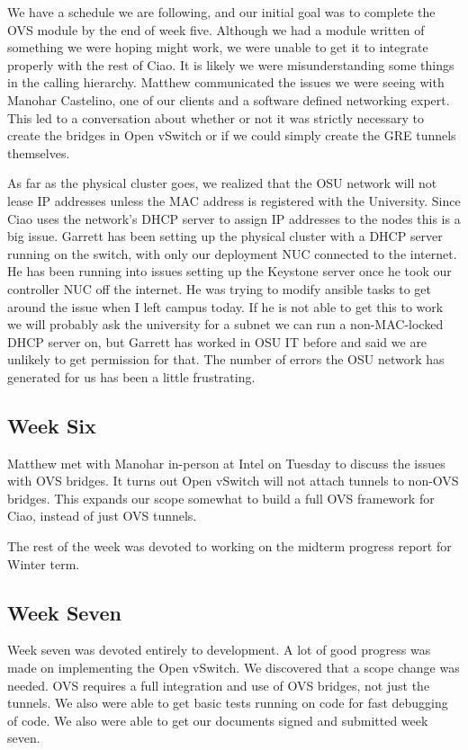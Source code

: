 \documentclass[10pt,onecolumn,journal,draftclsnofoot]{IEEEtran}
\begin{document}
We have a schedule we are following, and our initial goal was to complete the
OVS module by the end of week five. Although we had a module written of
something we were hoping might work, we were unable to get it to integrate
properly with the rest of Ciao.  It is likely we were misunderstanding some
things in the calling hierarchy.  Matthew communicated the issues we were seeing
with Manohar Castelino, one of our clients and a software defined networking
expert. This led to a conversation about whether or not it was strictly
necessary to create the bridges in Open vSwitch or if we could simply create the
GRE tunnels themselves.

As far as the physical cluster goes, we realized that the OSU network will not
lease IP addresses unless the MAC address is registered with the University.
Since Ciao uses the network's DHCP server to assign IP addresses to the nodes
this is a big issue. Garrett has been setting up the physical cluster with a
DHCP server running on the switch, with only our deployment NUC connected to the
internet. He has been running into issues setting up the Keystone server once he
took our controller NUC off the internet. He was trying to modify ansible tasks
to get around the issue when I left campus today. If he is not able to get this
to work we will probably ask the university for a subnet we can run a
non-MAC-locked DHCP server on, but Garrett has worked in OSU IT before and said
we are unlikely to get permission for that. The number of errors the OSU network
has generated for us has been a little frustrating.

\subsection{Week Six}

Matthew met with Manohar in-person at Intel on Tuesday to discuss the issues
with OVS bridges. It turns out Open vSwitch will not attach tunnels to non-OVS
bridges. This expands our scope somewhat to build a full OVS framework for Ciao,
instead of just OVS tunnels.

The rest of the week was devoted to working on the midterm progress report for
Winter term.

\subsection{Week Seven}
Week seven was devoted entirely to development. A lot of good progress was made
on implementing the Open vSwitch. We discovered that a scope change was needed.
OVS requires a full integration and use of OVS bridges, not just the tunnels. 
We also were able to get basic tests running on code for fast debugging of
code. We also were able to get our documents signed and submitted week seven.
\end{document}
